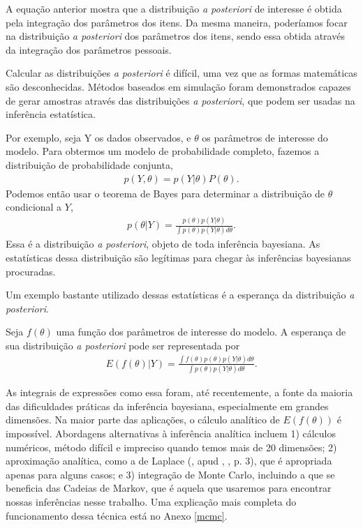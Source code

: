 \documentclass[
	12pt,				%
	openright,			%
	twoside,			%
	a4paper,			%
	english,			%
	brazil				%
	]{abntex2}
\begin{document}
 A equação anterior mostra que a distribuição \emph{a posteriori} de interesse é obtida pela integração dos parâmetros dos itens. Da mesma maneira, poderíamos focar na distribuição \emph{a posteriori} dos parâmetros dos itens, sendo essa obtida através da integração dos parâmetros pessoais.

 Calcular as distribuições \emph{a posteriori} é difícil, uma vez que as formas matemáticas são desconhecidas. Métodos baseados em simulação foram demonstrados capazes de gerar amostras através das distribuições \emph{a posteriori}, que podem ser usadas na inferência estatística.
 
 Por exemplo, seja Y os dados observados, e $\theta$ os parâmetros de interesse do modelo. Para obtermos um modelo de probabilidade completo, fazemos a distribuição de probabilidade conjunta, 
 \begin{equation}
    \begin{aligned}
        p(Y, \theta) = p(Y|\theta)P(\theta).
     \end{aligned}
 \end{equation}
 Podemos então usar o teorema de Bayes para determinar a distribuição de $\theta$ condicional a $Y$,
 \begin{equation}
    \begin{aligned}
        p(\theta|Y) = \frac{p(\theta) p(Y|\theta)}{\int p(\theta) p(Y|\theta) d\theta}.
     \end{aligned}
 \end{equation}
 Essa é a distribuição \emph{a posteriori}, objeto de toda inferência bayesiana. As estatísticas dessa distribuição são legítimas para chegar às inferências bayesianas procuradas.
 
 Um exemplo bastante utilizado dessas estatísticas é a esperança da distribuição \emph{a posteriori}.
 
 Seja $f(\theta)$ uma função dos parâmetros de interesse do modelo. A esperança de sua distribuição \emph{a posteriori} pode ser representada por
 \begin{equation}
    \begin{aligned}
        E(f(\theta)|Y) = \frac{\int f(\theta) p(\theta) p(Y|\theta) d\theta}{\int p(\theta) p(Y|\theta) d\theta}.
     \end{aligned}
     \label{equacaomcmcanexo}
 \end{equation}
 
 As integrais de expressões como essa foram, até recentemente, a fonte da maioria das dificuldades práticas da inferência bayesiana, especialmente em grandes dimensões. Na maior parte das aplicações, o cálculo analítico de $E(f(\theta))$ é impossível. Abordagens alternativas à inferência analítica incluem 1) cálculos numéricos, método difícil e impreciso quando temos mais de 20 dimensões; 2) aproximação analítica, como a de Laplace (, \citeyear{kass1988} apud , \citeyear{gilks1996}, p. 3), que é apropriada apenas para alguns casos; e 3) integração de Monte Carlo, incluindo a que se beneficia das Cadeias de Markov, que é aquela que usaremos para encontrar nossas inferências nesse trabalho. Uma explicação mais completa do funcionamento dessa técnica está no Anexo \ref{mcmc}.
 
\end{document}
